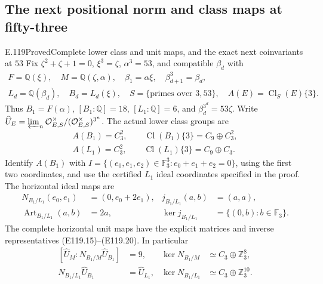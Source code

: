 \subsection{The next positional norm and class maps at fifty-three}

\begin{statement}{E.119}{Proved}{Complete lower class and unit maps, and the exact next coinvariants at $53$}
Fix $\zeta^2+\zeta+1=0$, $\xi^3=\zeta$, $\alpha^3=53$,
and compatible $\beta_d$ with
\[
 \begin{gathered}
 F=\mathbb Q(\xi),\quad M=\mathbb Q(\zeta,\alpha),\quad
 \beta_1=\alpha\xi,\quad \beta_{d+1}^3=\beta_d,\\
 L_d=\mathbb Q(\beta_d),\quad B_d=L_d(\xi),\quad
 S=\{\text{primes over }3,53\},\quad
 A(E)=\operatorname{Cl}_S(E)\{3\}.
 \end{gathered}
 \tag{E119.1}
\]
Thus $B_1=F(\alpha)$, $[B_1:\mathbb Q]=18$,
$[L_1:\mathbb Q]=6$, and $\beta_d^{3^d}=53\zeta$.
Write $\widehat U_E=\varprojlim_n
\mathcal O_{E,S}^{\times}/(\mathcal O_{E,S}^{\times})^{3^n}$.
The actual lower class groups are
\[
 \begin{gathered}
 A(B_1)=C_3^2,\qquad \operatorname{Cl}(B_1)\{3\}=C_9\oplus C_3^2,\\
 A(L_1)=C_3^2,\qquad \operatorname{Cl}(L_1)\{3\}=C_9\oplus C_3.
 \end{gathered}
 \tag{E119.2}
\]
Identify $A(B_1)$ with
$I=\{(e_0,e_1,e_2)\in\mathbb F_3^3:e_0+e_1+e_2=0\}$,
using the first two coordinates, and use the certified $L_1$ ideal
coordinates specified in the proof. The horizontal ideal maps are
\[
 \begin{aligned}
 N_{B_1/L_1}(e_0,e_1)&=(0,e_0+2e_1),&
 j_{B_1/L_1}(a,b)&=(a,a),\\
 \operatorname{Art}_{B_1/L_1}(a,b)&=2a,&
 \ker j_{B_1/L_1}&=\{(0,b):b\in\mathbb F_3\}.
 \end{aligned}
 \tag{E119.3}
\]
The complete horizontal unit maps have the explicit matrices and
inverse representatives (E119.15)--(E119.20). In particular
\[
 \begin{aligned}
 [\widehat U_M:N_{B_1/M}\widehat U_{B_1}]&=9,&
 \ker N_{B_1/M}&\simeq C_3\oplus\mathbb Z_3^8,\\
 N_{B_1/L_1}\widehat U_{B_1}&=\widehat U_{L_1},&
 \ker N_{B_1/L_1}&\simeq C_3\oplus\mathbb Z_3^{10}.
 \end{aligned}
 \tag{E119.4}
\]


\end{statement}
